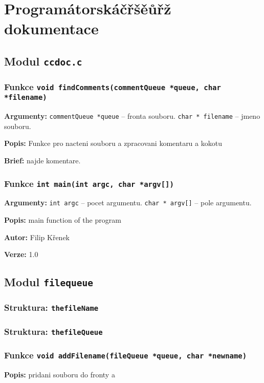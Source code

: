 \documentclass[12pt, a4paper]{article}
\begin{document}
\section{Programátorskáčřšěůřž dokumentace}
\subsection{Modul \texttt{ccdoc.c}}
\subsubsection{Funkce \texttt{void findComments(commentQueue *queue, char *filename)}}
\textbf{Argumenty: }\verb"commentQueue *queue" -- fronta souboru. \verb"char * filename" -- jmeno souboru. \\
\par\noindent
\textbf{Popis: }Funkce pro nacteni souboru a zpracovani komentaru a kokotu\\
\par\noindent
\textbf{Brief: } najde komentare.\\
\par\noindent
\subsubsection{Funkce \texttt{int main(int argc, char *argv[])}}
\textbf{Argumenty: }\verb"int argc" -- pocet argumentu. \verb"char * argv[]" -- pole argumentu. \\
\par\noindent
\textbf{Popis: }main function of the program\\
\par\noindent
\textbf{Autor: } \textcopyright{} Filip Křenek\\
\par\noindent
\textbf{Verze: } 1.0\\
\par\noindent
\subsection{Modul \texttt{filequeue}}
\subsubsection{Struktura: \texttt{thefileName}}
\subsubsection{Struktura: \texttt{thefileQueue}}
\subsubsection{Funkce \texttt{void addFilename(fileQueue *queue, char *newname)}}
\textbf{Popis: }pridani souboru do fronty a\\
\par\noindent
\end{document}
